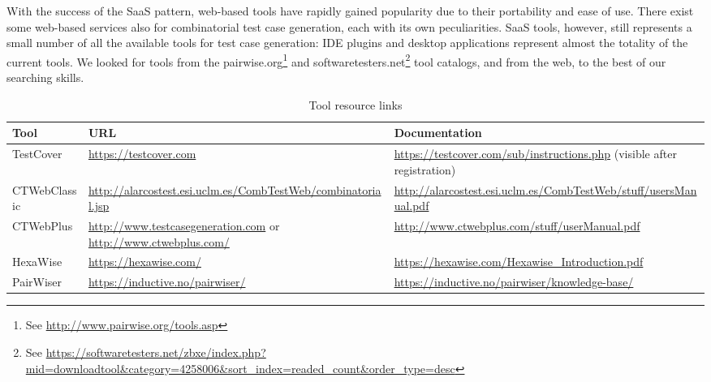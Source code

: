 \begin{tikzborder}{\cite{Gargantini16:validation}}
\begin{tikzborder}{\cite{gargantini_combinatorial_2017}}
\begin{tikzborder}{\cite{gargantini_combinatorial_2017}}
\begin{tikzborder}{\cite{garn2019}}
\begin{tikzborder}{\cite{arcaini2019achieving}}
\begin{tikzborder}{}
With the success of the SaaS pattern, web-based tools have rapidly gained popularity due to their portability and ease of use. There exist some web-based services also for combinatorial test case generation, each with its own peculiarities. SaaS tools, however, still represents a small number of all the available tools for test case generation: IDE plugins and desktop applications represent almost the totality of the current tools. We looked for tools from the pairwise.org\footnote{See \url{http://www.pairwise.org/tools.asp}} and softwaretesters.net\footnote{See \url{https://softwaretesters.net/zbxe/index.php?mid=downloadtool&category=4258006&sort_index=readed_count&order_type=desc}} tool catalogs, and from the web, to the best of our searching skills. 
\end{tikzborder}

\begin{table}[!hbt]
	\centering
	\footnotesize
	\setlength\tabcolsep{2pt}
	\begin{tabular}{l P{52mm} P{52mm}}
		Tool & URL & Documentation \\
		\toprule
		TestCover & \url{https://testcover.com} & \url{https://testcover.com/sub/instructions.php} (visible after registration) \\
		\midrule
		CTWebClassic & \url{http://alarcostest.esi.uclm.es/CombTestWeb/combinatorial.jsp} & \url{http://alarcostest.esi.uclm.es/CombTestWeb/stuff/usersManual.pdf} \\
		\midrule
		CTWebPlus & \url{http://www.testcasegeneration.com} or \url{http://www.ctwebplus.com/} & \url{http://www.ctwebplus.com/stuff/userManual.pdf} \\
		\midrule
		HexaWise & \url{https://hexawise.com/} & \url{https://hexawise.com/Hexawise_Introduction.pdf} \\
		\midrule
		PairWiser & \url{https://inductive.no/pairwiser/} & \url{https://inductive.no/pairwiser/knowledge-base/} \\
		\bottomrule
	\end{tabular}\caption{Tool resource links}\label{tab:docs}
\end{table}


\end{tikzborder}
\end{tikzborder}
\end{tikzborder}
\end{tikzborder}
\end{tikzborder}
